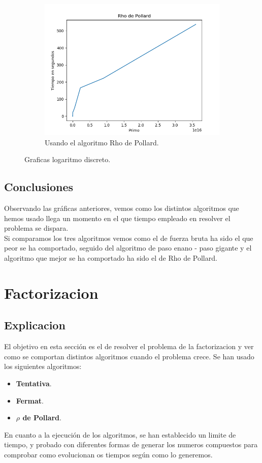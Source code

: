 \documentclass[12pt,spanish]{article}
\begin{document}
\begin{figure}[!htbp]
\begin{subfigure}{.5\textwidth}
				\includegraphics[width=.8\linewidth]{log_ro}
				\caption{Usando el algoritmo Rho de Pollard.}
				\label{fig:sfig13}
			\end{subfigure}
		\caption{Graficas logaritmo discreto.}
		\label{fig:fig1}
		\end{figure}
	\subsection{Conclusiones}
	Observando las gráficas anteriores, vemos como los distintos algoritmos que hemos usado llega un momento en el que tiempo empleado en resolver el problema se dispara.\\
	Si comparamos los tres algoritmos vemos como el de fuerza bruta ha sido el que peor se ha comportado, seguido del algoritmo de paso enano - paso gigante y el algoritmo que mejor se ha comportado ha sido el de Rho de Pollard.\\
	
	\section{Factorizacion}
	\subsection{Explicacion}
	El objetivo en esta sección es el de resolver el problema de la factorizacion y ver como se comportan distintos algoritmos cuando el problema crece.
	 	Se han usado los siguientes algoritmos: 
	 	\begin{itemize}
	 		\item\textbf{Tentativa}.
	 		\item\textbf{Fermat}.
	 		\item\textbf{\boldmath $\rho$ de Pollard}.
	 	\end{itemize}
		En cuanto a la ejecución de los algoritmos, se han establecido un limite de tiempo, y probado con diferentes formas de generar los numeros compuestos para comprobar como evolucionan os tiempos según como lo generemos.
	
\end{document}
